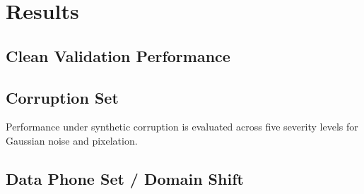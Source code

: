 \section{Results}
\label{results}

\subsection{Clean Validation Performance}



\subsection{Corruption Set}
Performance under synthetic corruption is evaluated across five severity levels for Gaussian noise and pixelation.




\subsection{Data Phone Set / Domain Shift}










